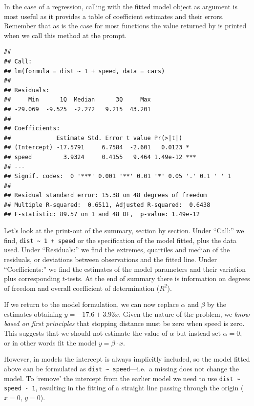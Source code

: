 \documentclass[krantz2]{krantz}\usepackage{knitr}%
\begin{document}
In the case of a regression, calling  with the fitted model object as argument is most useful as it provides a table of coefficient estimates and their errors. Remember that as is the case for most \Rlang functions the value returned by  is printed when we call this method at the \Rlang prompt.
\begin{knitrout}\footnotesize
{}\color{fgcolor}\begin{kframe}
\begin{alltt}
\end{alltt}
\begin{verbatim}
## 
## Call:
## lm(formula = dist ~ 1 + speed, data = cars)
## 
## Residuals:
##     Min      1Q  Median      3Q     Max 
## -29.069  -9.525  -2.272   9.215  43.201 
## 
## Coefficients:
##             Estimate Std. Error t value Pr(>|t|)    
## (Intercept) -17.5791     6.7584  -2.601   0.0123 *  
## speed         3.9324     0.4155   9.464 1.49e-12 ***
## ---
## Signif. codes:  0 '***' 0.001 '**' 0.01 '*' 0.05 '.' 0.1 ' ' 1
## 
## Residual standard error: 15.38 on 48 degrees of freedom
## Multiple R-squared:  0.6511,	Adjusted R-squared:  0.6438 
## F-statistic: 89.57 on 1 and 48 DF,  p-value: 1.49e-12
\end{verbatim}
\end{kframe}
\end{knitrout}

Let's look at the print-out of the summary, section by section. Under ``Call:'' we find, \verb|dist ~ 1 + speed| or the specification of the model fitted, plus the data used. Under ``Residuals:'' we find the extremes, quartiles and median of the residuals, or deviations between observations and the fitted line. Under ``Coefficients:'' we find the estimates of the model parameters and their variation plus corresponding $t$-tests. At the end of summary there is information on degrees of freedom and overall coefficient of determination ($R^2$).

If we return to the model formulation, we can now replace $\alpha$ and $\beta$ by the estimates obtaining $y = -17.6 + 3.93 x$. Given the nature of the problem, we \emph{know based on first principles} that stopping distance must be zero when speed is zero. This suggests that we should not estimate the value of $\alpha$ but instead set $\alpha = 0$, or in other words fit the model $y = \beta \cdot x$.

However, in \Rlang models the intercept is always implicitly included, so the model fitted above can be formulated as \verb|dist ~ speed|---i.e.\ a missing  does not change the model. To `remove' the intercept from the earlier model we need to use \verb|dist ~ speed - 1|, resulting in the fitting of a straight line passing through the origin ($x = 0$, $y = 0$).
\end{document}

